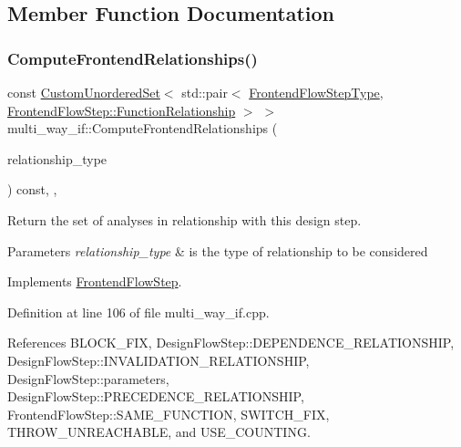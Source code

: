 \subsection{Member Function Documentation}
\mbox{\label{classmulti__way__if_a1c92b27310f15468fe430576a025a94f}} 
\subsubsection{\texorpdfstring{Compute\+Frontend\+Relationships()}{ComputeFrontendRelationships()}}
{\footnotesize\ttfamily const \hyperlink{classCustomUnorderedSet}{Custom\+Unordered\+Set}$<$ std\+::pair$<$ \hyperlink{frontend__flow__step_8hpp_afeb3716c693d2b2e4ed3e6d04c3b63bb}{Frontend\+Flow\+Step\+Type}, \hyperlink{classFrontendFlowStep_af7cf30f2023e5b99e637dc2058289ab0}{Frontend\+Flow\+Step\+::\+Function\+Relationship} $>$ $>$ multi\+\_\+way\+\_\+if\+::\+Compute\+Frontend\+Relationships (\begin{DoxyParamCaption}\item[{const \hyperlink{classDesignFlowStep_a723a3baf19ff2ceb77bc13e099d0b1b7}{Design\+Flow\+Step\+::\+Relationship\+Type}}]{relationship\+\_\+type }\end{DoxyParamCaption}) const\hspace{0.3cm}{\ttfamily [override]}, {\ttfamily [private]}, {\ttfamily [virtual]}}



Return the set of analyses in relationship with this design step. 


\begin{DoxyParams}{Parameters}
{\em relationship\+\_\+type} & is the type of relationship to be considered \\
\hline
\end{DoxyParams}


Implements \hyperlink{classFrontendFlowStep_abeaff70b59734e462d347ed343dd700d}{Frontend\+Flow\+Step}.



Definition at line 106 of file multi\+\_\+way\+\_\+if.\+cpp.



References B\+L\+O\+C\+K\+\_\+\+F\+IX, Design\+Flow\+Step\+::\+D\+E\+P\+E\+N\+D\+E\+N\+C\+E\+\_\+\+R\+E\+L\+A\+T\+I\+O\+N\+S\+H\+IP, Design\+Flow\+Step\+::\+I\+N\+V\+A\+L\+I\+D\+A\+T\+I\+O\+N\+\_\+\+R\+E\+L\+A\+T\+I\+O\+N\+S\+H\+IP, Design\+Flow\+Step\+::parameters, Design\+Flow\+Step\+::\+P\+R\+E\+C\+E\+D\+E\+N\+C\+E\+\_\+\+R\+E\+L\+A\+T\+I\+O\+N\+S\+H\+IP, Frontend\+Flow\+Step\+::\+S\+A\+M\+E\+\_\+\+F\+U\+N\+C\+T\+I\+ON, S\+W\+I\+T\+C\+H\+\_\+\+F\+IX, T\+H\+R\+O\+W\+\_\+\+U\+N\+R\+E\+A\+C\+H\+A\+B\+LE, and U\+S\+E\+\_\+\+C\+O\+U\+N\+T\+I\+NG.

